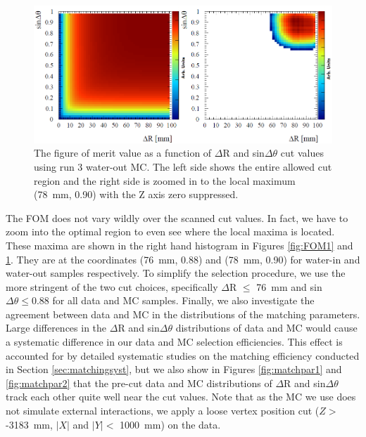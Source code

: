 \begin{figure}
\begin{center}
\includegraphics[width=6in]{Figures/FOM2.png}
\end{center}
\caption{The figure of merit value as a function of $\Delta$R and sin$\Delta\theta$ cut values using run 3 water-out MC. The left side shows the entire allowed cut region and the right side is zoomed in to the local maximum (78~mm, 0.90) with the Z axis zero suppressed.}
\label{fig:FOM2}
\end{figure}

The FOM does not vary wildly over the scanned cut values. In fact, we have to zoom into the optimal region to even see where the local maxima is located. These maxima are shown in the right hand histogram in Figures \ref{fig:FOM1} and \ref{fig:FOM2}. They are at the coordinates (76~mm, 0.88) and (78~mm, 0.90) for water-in and water-out samples respectively. To simplify the selection procedure, we use the more stringent of the two cut choices, specifically $\Delta$R $\leq$ 76~mm and sin$\Delta\theta\leq0.88$ for all data and MC samples. Finally, we also investigate the agreement between data and MC in the distributions of the matching parameters. Large differences in the $\Delta$R and sin$\Delta\theta$ distributions of data and MC would cause a systematic difference in our data and MC selection efficiencies. This effect is accounted for by detailed systematic studies on the matching efficiency conducted in Section \ref{sec:matchingsyst}, but we also show in Figures \ref{fig:matchpar1} and \ref{fig:matchpar2} that the pre-cut data and MC distributions of $\Delta$R and sin$\Delta\theta$ track each other quite well near the cut values. Note that as the MC we use does not simulate external interactions, we apply a loose vertex position cut ($Z>$ -3183~mm, $|X|$ and $|Y|<$ 1000~mm) on the data.

